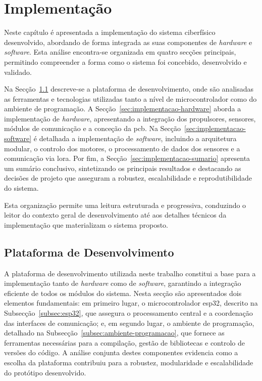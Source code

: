 
\chapter{Implementação}
\label{ch:implementacao}

Neste capítulo é apresentada a implementação do sistema ciberfísico desenvolvido, abordando de forma integrada as suas componentes de \emph{hardware} e \emph{software}. Esta análise encontra-se organizada em quatro secções principais, permitindo compreender a forma como o sistema foi concebido, desenvolvido e validado.  

Na Secção~\ref{sec:plataforma-desenvolvimento} descreve-se a plataforma de desenvolvimento, onde são analisadas as ferramentas e tecnologias utilizadas tanto a nível de microcontrolador como do ambiente de programação. A Secção~\ref{sec:implementacao-hardware} aborda a implementação de \emph{hardware}, apresentando a integração dos propulsores, sensores, módulos de comunicação e a conceção da \gls{pcb}. Na Secção~\ref{sec:implementacao-software} é detalhada a implementação de \emph{software}, incluindo a arquitetura modular, o controlo dos motores, o processamento de dados dos sensores e a comunicação via \gls{lora}. Por fim, a Secção~\ref{sec:implementacao-sumario} apresenta um sumário conclusivo, sintetizando os principais resultados e destacando as decisões de projeto que asseguram a robustez, escalabilidade e reprodutibilidade do sistema.

Esta organização permite uma leitura estruturada e progressiva, conduzindo o leitor do contexto geral de desenvolvimento até aos detalhes técnicos da implementação que materializam o sistema proposto.

\section{Plataforma de Desenvolvimento}
\label{sec:plataforma-desenvolvimento}

A plataforma de desenvolvimento utilizada neste trabalho constitui a base para a implementação tanto de \emph{hardware} como de \emph{software}, garantindo a integração eficiente de todos os módulos do sistema. Nesta secção são apresentados dois elementos fundamentais: em primeiro lugar, o microcontrolador \gls{esp32}, descrito na Subsecção~\ref{subsec:esp32}, que assegura o processamento central e a coordenação das interfaces de comunicação; e, em segundo lugar, o ambiente de programação, detalhado na Subsecção~\ref{subsec:ambiente-programacao}, que fornece as ferramentas necessárias para a compilação, gestão de bibliotecas e controlo de versões do código. A análise conjunta destes componentes evidencia como a escolha da plataforma contribuiu para a robustez, modularidade e escalabilidade do protótipo desenvolvido.


